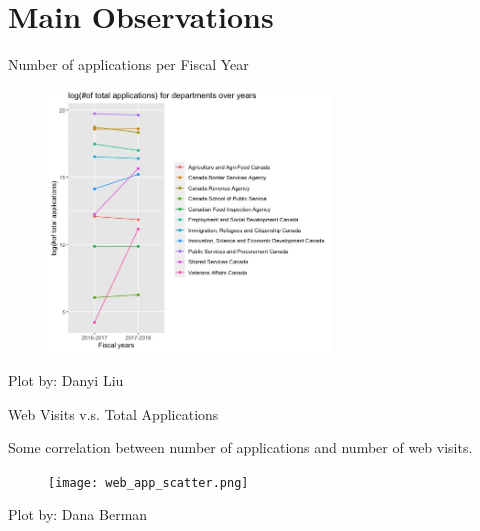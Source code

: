 \documentclass[compress]{beamer}
\begin{document}
\section{Main Observations}

\begin{frame}{Number of applications per Fiscal Year}
\begin{figure}[htp]
    \centering
    \includegraphics[width=7.5cm]{2.jpeg}
\end{figure}

\hfill\tiny{Plot by: Danyi Liu}
\end{frame}


\begin{frame}{Web Visits v.s. Total Applications }
   
   Some correlation between number of applications and number of web visits.
   \vfill
    \begin{figure}
        \centering
        \texttt{[image: web\_app\_scatter.png]}
        \label{fig:my_label}
    \end{figure}
    \vfill
\hfill\tiny{Plot by: Dana Berman}
\end{frame}
\end{document}
